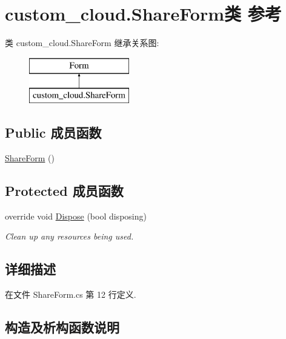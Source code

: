 \hypertarget{classcustom__cloud_1_1_share_form}{}\section{custom\+\_\+cloud.\+Share\+Form类 参考}
\label{classcustom__cloud_1_1_share_form}
类 custom\+\_\+cloud.\+Share\+Form 继承关系图\+:\begin{figure}[H]
\begin{center}
\leavevmode
\includegraphics[height=2.000000cm]{classcustom__cloud_1_1_share_form}
\end{center}
\end{figure}
\subsection*{Public 成员函数}
\begin{DoxyCompactItemize}
\item 
\hyperlink{classcustom__cloud_1_1_share_form_ade1b5c73e2642877f35d4e95515a2137}{Share\+Form} ()
\end{DoxyCompactItemize}
\subsection*{Protected 成员函数}
\begin{DoxyCompactItemize}
\item 
override void \hyperlink{classcustom__cloud_1_1_share_form_ac05868b24cc132c82170cd466d9d92c6}{Dispose} (bool disposing)
\begin{DoxyCompactList}\small\item\em Clean up any resources being used. \end{DoxyCompactList}\end{DoxyCompactItemize}


\subsection{详细描述}


在文件 Share\+Form.\+cs 第 12 行定义.



\subsection{构造及析构函数说明}
\mbox{\label{classcustom__cloud_1_1_share_form_ade1b5c73e2642877f35d4e95515a2137}} 
